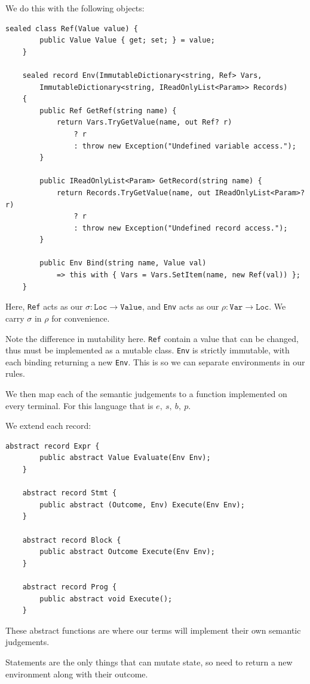 \documentclass[11pt,a4paper]{article}
\newcommand{\kw}[1]{\mathtt{#1}}                     %
\begin{document}
We do this with the following objects:
\begin{lstlisting}[language=CSharp, tabsize=4]
	sealed class Ref(Value value) {
		public Value Value { get; set; } = value;
	}
	
	sealed record Env(ImmutableDictionary<string, Ref> Vars, 
		ImmutableDictionary<string, IReadOnlyList<Param>> Records)
	{
		public Ref GetRef(string name) {
			return Vars.TryGetValue(name, out Ref? r) 
				? r 
				: throw new Exception("Undefined variable access.");
		}
		
		public IReadOnlyList<Param> GetRecord(string name) {
			return Records.TryGetValue(name, out IReadOnlyList<Param>? r) 
				? r 
				: throw new Exception("Undefined record access.");
		}
		
		public Env Bind(string name, Value val)
			=> this with { Vars = Vars.SetItem(name, new Ref(val)) };
	}
\end{lstlisting}

Here, \lstinline|Ref| acts as our  $\sigma : \kw{Loc} \to \kw{Value}$, and \lstinline|Env| acts as our $\rho : \kw{Var} \to \kw{Loc}$. We carry $\sigma$ in $\rho$ for convenience. 

Note the difference in mutability here. \lstinline|Ref| contain a value that can be changed, thus must be implemented as a mutable class. \lstinline|Env| is strictly immutable, with each binding returning a new \lstinline|Env|. This is so we can separate environments in our rules.

We then map each of the semantic judgements to a function implemented on every terminal. For this language that is $e,\ s,\ b,\ p$.
 
We extend each record:

\begin{lstlisting}[language=CSharp, tabsize=4]
	abstract record Expr {
		public abstract Value Evaluate(Env Env);
	}
	
	abstract record Stmt {
		public abstract (Outcome, Env) Execute(Env Env);
	}
	
	abstract record Block {
		public abstract Outcome Execute(Env Env);
	}
	
	abstract record Prog {
		public abstract void Execute();
	}
\end{lstlisting}

These abstract functions are where our terms will implement their own semantic judgements.

Statements are the only things that can mutate state, so need to return a new environment along with their outcome.
\end{document}
